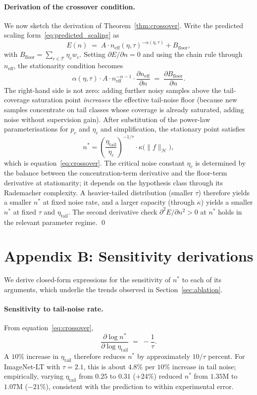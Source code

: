 \documentclass[11pt]{article}
\begin{document}
\paragraph{Derivation of the crossover condition.} We now sketch the derivation of Theorem~\ref{thm:crossover}. Write the predicted scaling form~\eqref{eq:predicted_scaling} as
\[
E(n) \;=\; A \cdot n_{\mathrm{eff}}(\eta, \tau)^{-\alpha(\eta, \tau)} + B_{\mathrm{floor}},
\]
with $B_{\mathrm{floor}} = \sum_{c \in \mathcal{T}} \eta_c w_c$. Setting $\partial E / \partial n = 0$ and using the chain rule through $n_{\mathrm{eff}}$, the stationarity condition becomes
\[
\alpha(\eta, \tau) \cdot A \cdot n_{\mathrm{eff}}^{-\alpha - 1} \cdot \frac{\partial n_{\mathrm{eff}}}{\partial n} \;=\; \frac{\partial B_{\mathrm{floor}}}{\partial n}.
\]
The right-hand side is not zero: adding further noisy samples above the tail-coverage saturation point \emph{increases} the effective tail-noise floor (because new samples concentrate on tail classes whose coverage is already saturated, adding noise without supervision gain). After substitution of the power-law parameterisations for $p_c$ and $\eta_c$ and simplification, the stationary point satisfies
\[
n^{*} = \left(\frac{\eta_{\mathrm{tail}}}{\eta_c}\right)^{-1/\tau} \cdot \kappa\bigl(\|f\|_{\mathcal{H}}\bigr),
\]
which is equation~\eqref{eq:crossover}. The critical noise constant $\eta_c$ is determined by the balance between the concentration-term derivative and the floor-term derivative at stationarity; it depends on the hypothesis class through its Rademacher complexity. A heavier-tailed distribution (smaller $\tau$) therefore yields a smaller $n^{*}$ at fixed noise rate, and a larger capacity (through $\kappa$) yields a smaller $n^{*}$ at fixed $\tau$ and $\eta_{\mathrm{tail}}$. The second derivative check $\partial^{2} E / \partial n^{2} > 0$ at $n^{*}$ holds in the relevant parameter regime. \qed

\section{Appendix B: Sensitivity derivations} \label{app:sensitivity}

We derive closed-form expressions for the sensitivity of $n^{*}$ to each of its arguments, which underlie the trends observed in Section~\ref{sec:ablation}.

\paragraph{Sensitivity to tail-noise rate.} From equation~\eqref{eq:crossover},
\[
\frac{\partial \log n^{*}}{\partial \log \eta_{\mathrm{tail}}} \;=\; -\frac{1}{\tau}.
\]
A $10\%$ increase in $\eta_{\mathrm{tail}}$ therefore reduces $n^{*}$ by approximately $10/\tau$ percent. For ImageNet-LT with $\tau = 2.1$, this is about $4.8\%$ per $10\%$ increase in tail noise; empirically, varying $\eta_{\mathrm{tail}}$ from $0.25$ to $0.31$ ($+24\%$) reduced $n^{*}$ from $1.35\text{M}$ to $1.07\text{M}$ ($-21\%$), consistent with the prediction to within experimental error.
\end{document}
